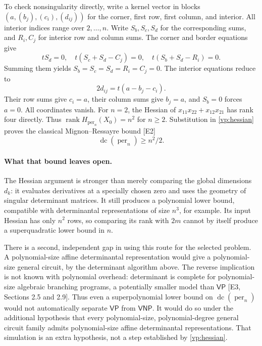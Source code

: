 \documentclass[11pt]{article}
\begin{document}
To check nonsingularity directly, write a kernel vector in blocks
$(a,(b_j),(c_i),(d_{ij}))$ for the corner, first row, first column,
and interior. All interior indices range over $2,\ldots,n$.
Write $S_b,S_c,S_d$ for the corresponding sums, and $R_i,C_j$ for
interior row and column sums. The corner and border equations give
\[
 tS_d=0,\quad t(S_c+S_d-C_j)=0,\quad
 t(S_b+S_d-R_i)=0.
\]
Summing them yields $S_b=S_c=S_d=R_i=C_j=0$.
The interior equations reduce to
\[
 2d_{ij}=t(a-b_j-c_i).
\]
Their row sums give $c_i=a$, their column sums give $b_j=a$, and
$S_b=0$ forces $a=0$. All coordinates vanish. For $n=2$, the
Hessian of $x_{11}x_{22}+x_{12}x_{21}$ has rank four directly.
Thus $\operatorname{rank}H_{\operatorname{per}_n}(X_0)=n^2$ for
$n\ge2$. Substitution in \eqref{vp:hessian} proves the classical
Mignon--Ressayre bound [E2]
\begin{equation}\label{vp:dc}
 \operatorname{dc}(\operatorname{per}_n)\ge n^2/2.
\end{equation}

\paragraph{What that bound leaves open.}
The Hessian argument is stronger than merely comparing the global
dimensions $d_k$: it evaluates derivatives at a specially chosen zero
and uses the geometry of singular determinant matrices. It still
produces a polynomial lower bound, compatible with determinantal
representations of size $n^3$, for example. Its input Hessian has only
$n^2$ rows, so comparing its rank with $2m$ cannot by itself produce
a superquadratic lower bound in $n$.

There is a second, independent gap in using this route for the selected
problem. A polynomial-size affine determinantal representation would
give a polynomial-size general circuit, by the determinant algorithm
above. The reverse implication is not known with polynomial overhead:
determinant is complete for polynomial-size algebraic branching
programs, a potentially smaller model than $\mathsf{VP}$ [E3,
Sections 2.5 and 2.9]. Thus even a superpolynomial lower bound on
$\operatorname{dc}(\operatorname{per}_n)$ would not automatically
separate $\mathsf{VP}$ from $\mathsf{VNP}$. It would do so under the
additional hypothesis that every polynomial-size, polynomial-degree
general circuit family admits polynomial-size affine determinantal
representations. That simulation is an extra hypothesis, not a step
established by \eqref{vp:hessian}.
\end{document}
